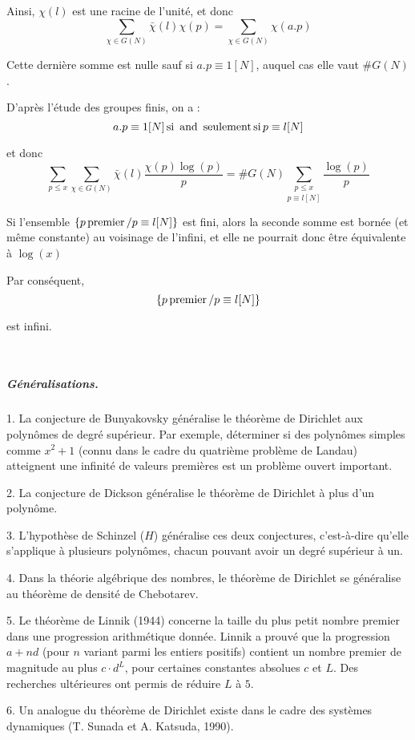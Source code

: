 Ainsi, $\chi (l)$ est une racine de l'unit{\'e}, et donc
\[ \underset{\chi \in G (N)}{\sum} \bar{\chi} (l) \chi (p) = \underset{\chi
   \in G (N)}{\sum} \chi (a.p) \]


Cette derni{\`e}re somme est nulle sauf si $a.p \equiv 1 [N]$, auquel cas elle
vaut $\#G (N)$.

D'apr{\`e}s l'{\'e}tude des groupes finis, on a :
\[ a.p \equiv 1 [N] \operatorname{si} \text{ and } \operatorname{seulement} \operatorname{si} p \equiv l
   [N] \]


et donc
\[ \underset{p \leqslant x}{\sum}  \underset{\chi \in G (N)}{\sum} \bar{\chi}
   (l) \frac{\chi (p) \log (p)}{p} =\#G (N) \underset{p \equiv l
   [N]}{\underset{p \leqslant x}{\sum}} \frac{\log (p)}{p} \]


Si l'ensemble $\{ p \operatorname{premier} / p \equiv l [N] \}$ est fini, alors la
seconde somme est born{\'e}e (et m{\^e}me constante) au voisinage de l'infini,
et elle ne pourrait donc {\^e}tre {\'e}quivalente {\`a} $\log (x)$

Par cons{\'e}quent,
\[ \{ p \operatorname{premier} / p \equiv l [N] \}  \]


est infini.

\

\subparagraph{Généralisations.}

1. La conjecture de Bunyakovsky généralise le théorème de
Dirichlet aux polyn{\^o}mes de degr{\'e} sup{\'e}rieur. Par exemple,
d{\'e}terminer si des polyn{\^o}mes simples comme $x^2 + 1$ (connu dans le
cadre du quatri{\`e}me probl{\`e}me de Landau) atteignent une infinit{\'e} de
valeurs premi{\`e}res est un probl{\`e}me ouvert important.

2. La conjecture de Dickson g{\'e}n{\'e}ralise le th{\'e}or{\`e}me de
Dirichlet {\`a} plus d'un polyn{\^o}me.

3. L'hypoth{\`e}se de Schinzel ($H$) g{\'e}n{\'e}ralise ces deux conjectures,
c'est-{\`a}-dire qu'elle s'applique {\`a} plusieurs polyn{\^o}mes, chacun
pouvant avoir un degr{\'e} sup{\'e}rieur {\`a} un.

4. Dans la th{\'e}orie alg{\'e}brique des nombres, le th{\'e}or{\`e}me de
Dirichlet se g{\'e}n{\'e}ralise au th{\'e}or{\`e}me de densit{\'e} de
Chebotarev.

5. Le th{\'e}or{\`e}me de Linnik (1944) concerne la taille du plus petit
nombre premier dans une progression arithm{\'e}tique donn{\'e}e. Linnik a
prouv{\'e} que la progression $a + n d$ (pour $n$ variant parmi les entiers
positifs) contient un nombre premier de magnitude au plus $c \cdot d^L$, pour
certaines constantes absolues $c$ et $L$. Des recherches ult{\'e}rieures ont
permis de r{\'e}duire $L$ {\`a} $5$.

6. Un analogue du th{\'e}or{\`e}me de Dirichlet existe dans le cadre des
syst{\`e}mes dynamiques (T. Sunada et A. Katsuda, 1990).
